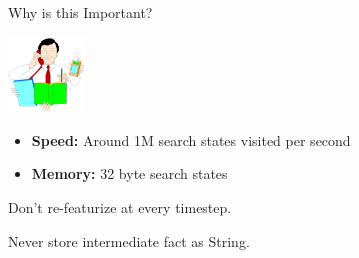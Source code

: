 \def\title{Why is this Important?}
\begin{frame}{\title}
\begin{center}
\includegraphics[height=2cm]{../img/efficient.png}
\end{center}

\begin{itemize}
\item \textbf{Speed:} Around 1M search states visited per second
\item \textbf{Memory:} 32 byte search states
\end{itemize}
\vspace{2ex}

 Don't re-featurize at every timestep.
\vspace{2ex}

 Never store intermediate fact as String.
\end{frame}




\newcommand{\hnode}[1]{|(#1)| \w{#1}}
\newcommand{\rnode}[2]{|(#1#2)| \w{\textcolor{darkblue}{\textbf{#1}}}\textcolor{white}{#2}}
\newcommand{\bnode}[2]{|(#1#2)| \w{\textcolor{darkblue}{\textcolor{darkred}{\textbf{#1}}}}\textcolor{white}{#2}}

\def\title{An Example Search}

